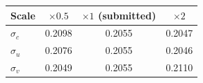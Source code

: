 \begin{tabular}{lccc}
\toprule
Scale & $\times 0.5$ & $\times 1$ (submitted) & $\times 2$ \\
\midrule
$\sigma_c$ & 0.2098 & 0.2055 & 0.2047 \\
$\sigma_u$ & 0.2076 & 0.2055 & 0.2046 \\
$\sigma_v$ & 0.2049 & 0.2055 & 0.2110 \\
\bottomrule
\end{tabular}
